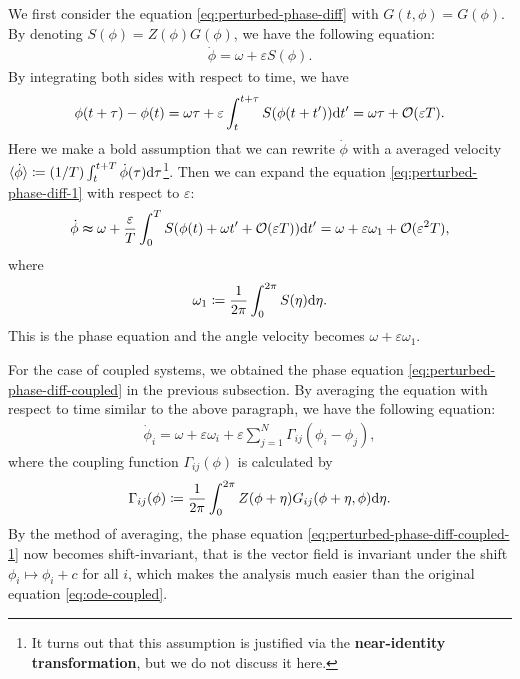 We first consider the equation \eqref{eq:perturbed-phase-diff} with $G(t,\phi)=G(\phi)$.
By denoting $S(\phi)=Z(\phi)G(\phi)$, we have the following equation:
\begin{align}
  \dot{\phi}=\omega + \varepsilon S(\phi).
  \label{eq:perturbed-phase-diff-1}
\end{align}
By integrating both sides with respect to time, we have
\begin{align}
  \phi(t+\tau)-\phi(t)=\omega\tau+\varepsilon\int_{t}^{t+\tau}S(\phi(t+t'))\mathrm{d} t'=\omega\tau+\mathcal{O}(\varepsilon T).
\end{align}
Here we make a bold assumption that we can rewrite $\dot{\phi}$ with a averaged velocity $\langle\dot{\phi}\rangle\coloneqq(1/T)\int_{t}^{t+T}\dot{\phi}(\tau)\mathrm{d}\tau$\footnote{It turns out that this assumption is justified via the \textbf{near-identity transformation}, but we do not discuss it here.}.
Then we can expand the equation \eqref{eq:perturbed-phase-diff-1} with respect to $\varepsilon$:
\begin{align}
  \dot{\phi}\thickapprox \omega+\frac{\varepsilon}{T}\int_{0}^{T}S(\phi(t)+\omega t'+\mathcal{O}(\varepsilon T))\mathrm{d} t'=\omega+\varepsilon\omega_{1}+\mathcal{O}(\varepsilon^{2}T),
\end{align}
where
\begin{align}
  \omega_{1}\coloneqq\frac{1}{2\pi}\int_{0}^{2\pi}S(\eta)\mathrm{d}\eta.
\end{align}
This is the phase equation and the angle velocity becomes $\omega+\varepsilon\omega_{1}$.

For the case of coupled systems, we obtained the phase equation \eqref{eq:perturbed-phase-diff-coupled} in the previous subsection.
By averaging the equation with respect to time similar to the above paragraph,
we have the following equation:
\begin{align}
  \dot{\phi}_{i}=\omega+\varepsilon\omega_{i}+\varepsilon\sum_{j=1}^{N}\Gamma_{ij}(\phi_{i}-\phi_{j}),
  \label{eq:perturbed-phase-diff-coupled-1}
\end{align}
where the coupling function $\Gamma_{ij}(\phi)$ is calculated by
\begin{align}
  \Gamma_{ij}(\phi)\coloneqq\frac{1}{2\pi}\int_{0}^{2\pi}Z(\phi+\eta)G_{ij}(\phi+\eta,\phi)\mathrm{d}\eta.
\end{align}
By the method of averaging, the phase equation \eqref{eq:perturbed-phase-diff-coupled-1} now becomes shift-invariant, that is the vector field is invariant under the shift $\phi_{i}\mapsto\phi_{i}+c$ for all $i$, which makes the analysis much easier than the original equation \eqref{eq:ode-coupled}.

